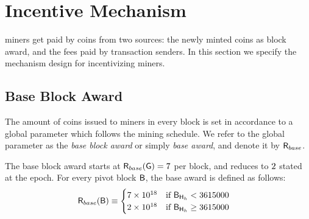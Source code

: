 
\section{Incentive Mechanism}
\label{sec:incentive}

\name miners get paid by \name coins from two sources: the newly minted \name coins as block award,
and the fees paid by transaction senders.
In this section we specify the mechanism design for incentivizing \name miners. 




\subsection{Base Block Award}
\label{subsec:baseaward}
The amount of coins issued to miners in every block is set in accordance to a global parameter which follows the mining schedule.
We refer to the global parameter as the \emph{base block award} or simply \emph{base award}, and denote it by $\textsf{R}_{base}$. 



	The base block award starts at $\textsf{R}_{base}(\textsf{G}) = 7$ \coinsign per block,
	and reduces to $2$ \coinsign stated at the \tanzaniteepoch epoch. 
	For every pivot block $\textsf{B}$, the base award is defined as follows:
	\begin{align}
		\textsf{R}_{base}(\textsf{B})&\equiv
		\begin{cases}
			7 \times 10^{18} & \mbox{if $\textsf{B}_{\textsf{H}_h}<3615000$} \\
			2 \times 10^{18} & \mbox{if $\textsf{B}_{\textsf{H}_h}\ge 3615000$}
		\end{cases}
	\end{align}

